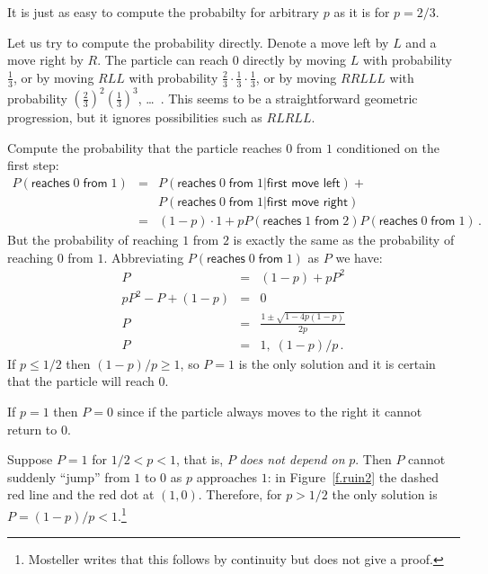 \solution{}

It is just as easy to compute the probabilty for arbitrary $p$ as it is for $p=2/3$.

Let us try to compute the probability directly. Denote a move left by $L$ and a move right by $R$. The particle can reach $0$ directly by moving $L$ with probability $\frac{1}{3}$, or by moving $RLL$ with probability $\frac{2}{3}\cdot\frac{1}{3}\cdot\frac{1}{3}$, or by moving $RRLLL$ with probability $\left(\frac{2}{3}\right)^2\left(\frac{1}{3}\right)^3$, \ldots\ . This seems to be a straightforward geometric progression, but it ignores possibilities such as $RLRLL$.

Compute the probability that the particle reaches $0$ from $1$ conditioned on the first step:
\begin{eqnarray*}
P(\textsf{reaches}\;0\;\textsf{from}\;1) &=& P(\textsf{reaches}\;0\;\textsf{from}\;1|\textsf{first move left}) +\\
&&P(\textsf{reaches}\;0\;\textsf{from}\;1|\textsf{first move right})\\
&=& (1-p)\cdot 1 + pP(\textsf{reaches}\;1\;\textsf{from}\;2)P(\textsf{reaches}\;0\;\textsf{from}\;1)\,.
\end{eqnarray*}
But the probability of reaching $1$ from $2$ is exactly the same as the probability of reaching $0$ from $1$. Abbreviating $P(\textsf{reaches}\;0\;\textsf{from}\;1)$ as $P$ we have:
\begin{eqnarray*}
P &=& (1-p) + pP^2\\
pP^2 - P + (1-p) &=&0\\
P&=& \frac{1\pm\sqrt{1-4p(1-p)}}{2p}\\
P&=&1,\; (1-p)/p\,.
\end{eqnarray*}
If $p\leq 1/2$ then $(1-p)/p\geq 1$, so $P=1$ is the only solution and it is certain that the particle will reach $0$.

If $p=1$ then $P=0$ since if the particle always moves to the right it cannot return to $0$.

Suppose $P=1$ for $1/2<p < 1$, that is, $P$ \emph{does not depend on} $p$. Then $P$ cannot suddenly ``jump'' from $1$ to $0$ as $p$ approaches $1$: in Figure~\ref{f.ruin2} the dashed red line and the red dot at $(1,0)$. Therefore, for $p> 1/2$ the only solution is $P=(1-p)/p< 1$.\footnote{Mosteller writes that this follows by continuity but does not give a proof.}

